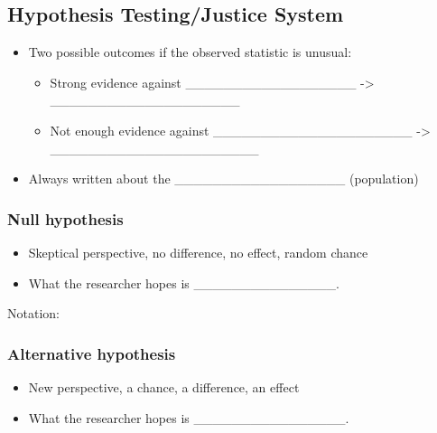 \documentclass[
]{report}
\begin{document}
\subsection*{Hypothesis Testing/Justice System}\label{hypothesis-testingjustice-system}


\begin{itemize}
\item
  Two possible outcomes if the observed statistic is unusual:

  \begin{itemize}
  \item
    Strong evidence against \_\_\_\_\_\_\_\_\_\_\_\_\_\_\_\_\_\_ -\textgreater{} \_\_\_\_\_\_\_\_\_\_\_\_\_\_\_\_\_\_\_\_
  \item
    Not enough evidence against \_\_\_\_\_\_\_\_\_\_\_\_\_\_\_\_\_\_\_\_\_ -\textgreater{} \_\_\_\_\_\_\_\_\_\_\_\_\_\_\_\_\_\_\_\_\_\_
  \end{itemize}
\item
  Always written about the \_\_\_\_\_\_\_\_\_\_\_\_\_\_\_\_\_\_ (population)
\end{itemize}


\subsubsection*{Null hypothesis}\label{null-hypothesis}

\begin{itemize}
\item
  Skeptical perspective, no difference, no effect, random chance
\item
  What the researcher hopes is \_\_\_\_\_\_\_\_\_\_\_\_\_\_\_.
\end{itemize}

Notation:

\vspace{0.2in}

\subsubsection*{Alternative hypothesis}\label{alternative-hypothesis}

\begin{itemize}
\item
  New perspective, a chance, a difference, an effect
\item
  What the researcher hopes is \_\_\_\_\_\_\_\_\_\_\_\_\_\_\_\_.
\end{itemize}
\end{document}
